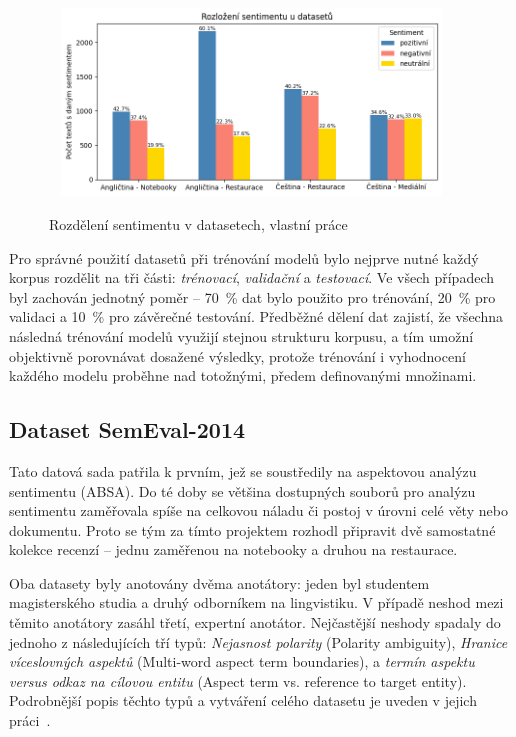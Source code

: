 \begin{figure}[ht]\
    \centering
    \includegraphics[width=0.9\textwidth]{images/sentiment-distribution}
    \caption[Rozdělení sentimentu v datasetech]%
    {Rozdělení sentimentu v datasetech, vlastní práce}
    \label{fig:SentimentDistribution}
\end{figure}

Pro správné použití datasetů při trénování modelů bylo nejprve nutné každý korpus rozdělit na tři části: \emph{trénovací}, \emph{validační} a \emph{testovací}. Ve všech případech byl zachován jednotný poměr -- 70~\% dat bylo použito pro trénování, 20~\% pro validaci a 10~\% pro závěrečné testování. Předběžné dělení dat zajistí, že všechna následná trénování modelů využijí stejnou strukturu korpusu, a tím umožní objektivně porovnávat dosažené výsledky, protože trénování i vyhodnocení každého modelu proběhne nad totožnými, předem definovanými množinami.

\subsection{Dataset SemEval-2014}
Tato datová sada patřila k prvním, jež se soustředily na aspektovou analýzu sentimentu (ABSA). Do té doby se většina dostupných souborů pro analýzu sentimentu zaměřovala spíše na celkovou náladu či postoj v úrovni celé věty nebo dokumentu. Proto se tým za tímto projektem rozhodl připravit dvě samostatné kolekce recenzí -- jednu zaměřenou na notebooky a druhou na restaurace.~\cite{pontiki-etal-2014-semeval}

Oba datasety byly anotovány dvěma anotátory: jeden byl studentem magisterského studia a druhý odborníkem na lingvistiku. V případě neshod mezi těmito anotátory zasáhl třetí, expertní anotátor. Nejčastější neshody spadaly do jednoho z následujících tří typů: \emph{Nejasnost polarity} (Polarity ambiguity), \emph{Hranice víceslovných aspektů} (Multi-word aspect term boundaries), a \emph{termín aspektu versus odkaz na cílovou entitu} (Aspect term vs. reference to target entity). Podrobnější popis těchto typů a vytváření celého datasetu je uveden v jejich práci~\cite{pontiki-etal-2014-semeval}.

